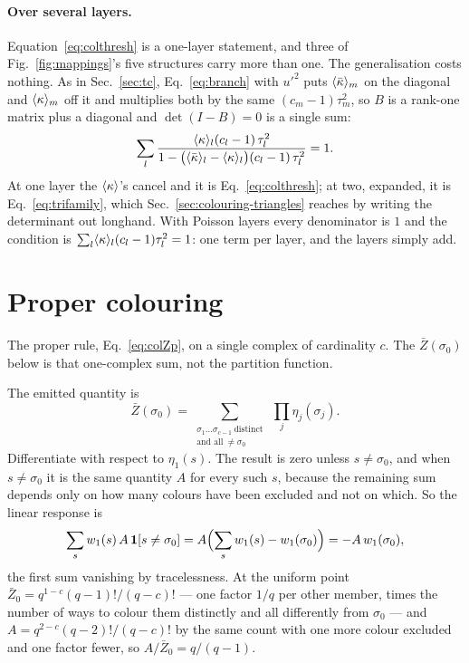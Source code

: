 \paragraph{Over several layers.} Equation~\eqref{eq:colthresh} is a
one-layer statement, and three of
Fig.~\ref{fig:mappings}'s five structures carry more than one. The
generalisation costs nothing. As in Sec.~\ref{sec:tc},
Eq.~\eqref{eq:branch} with $u'^{2}$ puts $\langle \bar\kappa \rangle_{m}$ on the diagonal and
$\langle \kappa \rangle_{m}$ off it and multiplies both by the same
$(c_{m}-1)\tau_{m}^{2}$, so $B$ is a rank-one matrix plus a diagonal and
$\det(I-B)=0$ is a single sum:
\begin{equation}
  \sum_{l}\frac{\langle \kappa \rangle_{l}(c_{l}-1)\,\tau_{l}^{2}}
               {1-\bigl(\langle \bar\kappa \rangle_{l}-\langle \kappa \rangle_{l}\bigr)(c_{l}-1)\,\tau_{l}^{2}}
  =1.
  \label{eq:colmulti}
\end{equation}
At one layer the $\langle \kappa \rangle$'s cancel and it is Eq.~\eqref{eq:colthresh}; at
two, expanded, it is Eq.~\eqref{eq:trifamily}, which
Sec.~\ref{sec:colouring-triangles} reaches by writing the determinant out
longhand. With Poisson layers every denominator is $1$ and the condition is
$\sum_{l}\langle \kappa \rangle_{l}(c_{l}-1)\tau_{l}^{2}=1$: one term per layer, and the
layers simply add.

\section{Proper colouring}
\label{sec:colouring-proper}

The proper rule, Eq.~\eqref{eq:colZp}, on a single complex of cardinality $c$.
The $\bar{Z}(\sigma_{0})$ below is that one-complex sum, not the partition
function.

The emitted quantity is
\[
  \bar{Z}(\sigma_{0})=\!\!\sum_{\substack{\sigma_{1}\dots\sigma_{c-1}\ \text{distinct}\\
    \text{and all}\ \ne\sigma_{0}}}\ \prod_{j}\eta_{j}(\sigma_{j}).
\]
Differentiate with respect to $\eta_{1}(s)$. The result is zero unless
$s\ne\sigma_{0}$, and when $s\ne\sigma_{0}$ it is the same quantity $A$ for
every such $s$, because the remaining sum depends only on how many colours have
been excluded and not on which. So the linear response is
\[
  \sum_{s}w_{1}(s)\,A\,\mathbf{1}[s\ne\sigma_{0}]
  =A\Bigl(\sum_{s}w_{1}(s)-w_{1}(\sigma_{0})\Bigr)=-A\,w_{1}(\sigma_{0}),
\]
the first sum vanishing by tracelessness. At the uniform point
$\bar{Z}_{0}=q^{1-c}(q-1)!/(q-c)!$ --- one factor $1/q$ per other member, times the
number of ways to colour them distinctly and all differently from $\sigma_{0}$
--- and $A=q^{2-c}(q-2)!/(q-c)!$ by the same count with one more colour excluded
and one factor fewer, so $A/\bar{Z}_{0}=q/(q-1)$.

